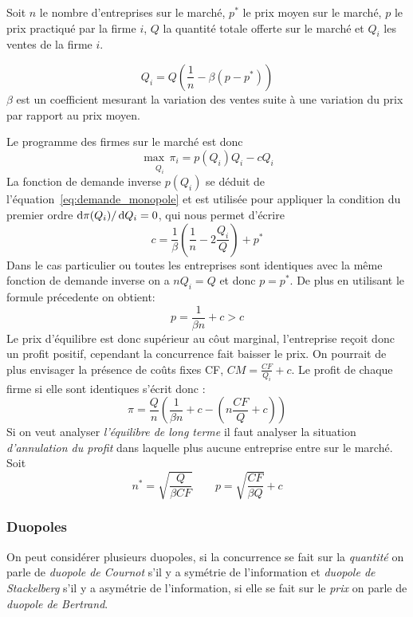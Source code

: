\begin{tcolorbox}[title=Concurrence monopolistique]
  Soit $n$ le nombre d'entreprises sur le marché, $p^*$ le prix moyen sur le marché,
  $p$ le prix practiqué par la firme $i$, $Q$ la quantité totale offerte sur le marché 
  et $Q_i$ les ventes de la firme $i$.
  
  \begin{equation}
  	Q_i= Q\left(\frac{1}{n}-\beta (p-p^*)\right)
    \label{eq:demande_monopole}
  \end{equation}
  $\beta$ est un coefficient mesurant la variation des ventes 
  suite à une variation du prix par rapport au prix moyen.
  
  Le programme des firmes sur le marché est donc
  \[
  	\underset{Q_i}{\max \, \pi_i}= p(Q_i)Q_i - c Q_i
  \]
  La fonction de demande inverse $p(Q_i)$ se déduit de l'équation~\ref{eq:demande_monopole}
  et est utilisée pour appliquer la condition du premier ordre $\operatorname{d}\! \pi(Q_i)/ \operatorname{d}\! Q_i = 0$,
  qui nous permet d'écrire
  \[
  	c= \frac{1}{\beta}\left(\frac{1}{n}-2\frac{Q_i}{Q}\right)+p^*
  \]
  Dans le cas particulier ou toutes les entreprises sont identiques 
  avec la même fonction de demande inverse on a $nQ_i=Q$ et donc $p=p^*$. 
  De plus en utilisant le formule précedente on obtient:
  \[
  	p=\frac{1}{\beta n}+c >c 
  \]
  Le prix d'équilibre est donc supérieur au côut marginal, 
  l'entreprise reçoit donc un profit positif, cependant la concurrence fait baisser le prix. 
  On pourrait de plus envisager la présence de coûts fixes CF, $CM=\frac{CF}{Q_i}+c$. 
  Le profit de chaque firme si elle sont identiques s'écrit donc :
  \[
  	\pi = \frac{Q}{n} \left( \frac{1}{\beta n}+c- \left( n\frac{CF}{Q}+c \right) \right)
  \]
  Si on veut analyser \emph{l'équilibre de long terme} 
  il faut analyser la situation \emph{d'annulation du profit} 
  dans laquelle plus aucune entreprise entre sur le marché.
  Soit
  \[
  	n^* = \sqrt{\frac{Q}{\beta CF}} \qquad p=\sqrt{\frac{CF}{\beta Q}}+c
  \]
\end{tcolorbox}

\subsubsection{Duopoles} %
\label{sub:duopoles}

On peut considérer plusieurs duopoles, si la concurrence se fait sur la \emph{quantité} 
on parle de \emph{duopole de Cournot} s'il y a symétrie de l'information
et \emph{duopole de Stackelberg} s'il y a asymétrie de l'information, 
si elle se fait sur le \emph{prix} on parle de \emph{duopole de Bertrand}.


